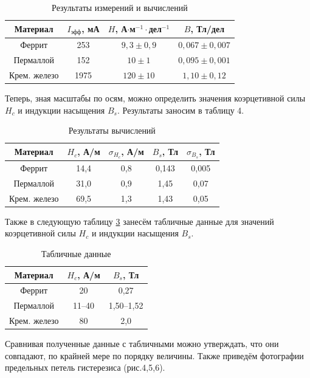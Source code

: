 \documentclass[12pt,a4paper]{article}
\begin{document}
\begin{table}[h!]
	\centering
	\begin{tabular}{|c|c|c|c|}
		\hline
		Материал     & $I_\text{эфф}$, мА & $H$, А$\cdot$м$^{-1}\cdot$дел$^{-1}$ & $B$, Тл/дел \\ \hline
		Феррит       & 253                & $9,3\pm0,9$                        & $0,067\pm0,007 $       \\ \hline
		Пермаллой    & 152                & $10\pm1$                       & $0,095\pm0,001$        \\ \hline
		Крем. железо & 1975                & $120\pm10$                       & $1,10\pm0,12$       \\ \hline
	\end{tabular}
	\caption{Результаты измерений и вычислений}
	\label{tab:izm}
\end{table}

Теперь, зная масштабы по осям, можно определить значения коэрцетивной силы $ H_c $
и индукции насыщения $ B_s $. Результаты заносим в таблицу 4.

\begin{table}[h!]
	\centering
	\begin{tabular}{|c|c|c|c|c|}
		\hline
		Материал     & $H_c$, А/м & $\sigma_{H_c}$, А/м & $B_s$, Тл & $\sigma_{B_s}$, Тл \\ \hline
		Феррит       & 14,4       & 0,8                & 0,143      & 0,005               \\ \hline
		Пермаллой    & 31,0      & 0,9                & 1,45      & 0,07               \\ \hline
		Крем. железо & 69,5      & 1,3                & 1,43      & 0,05               \\ \hline
	\end{tabular}
	\caption{Результаты вычислений}
	\label{tab:vichisl}
\end{table}

Также в следующую таблицу \ref{tab:tab} занесём табличные данные для значений коэрцетивной силы $ H_c $ и индукции насыщения $ B_s $.

\begin{table}[h!]
	\centering
	\begin{tabular}{|c|c|c|}
		\hline
		Материал     & $H_c$, А/м & $B_s$, Тл \\ \hline
		Феррит       & 20         & 0,27      \\ \hline
		Пермаллой    & 11--40     & 1,50--1,52      \\ \hline
		Крем. железо & 80    & 2,0      \\ \hline
	\end{tabular}
	\caption{Табличные данные}
	\label{tab:tab}
\end{table}
Сравнивая полученные данные с табличными можно утверждать, что они совпадают, по крайней мере по порядку величины. Также приведём фотографии предельных петель гистерезиса (рис.4,5,6).
\end{document}
